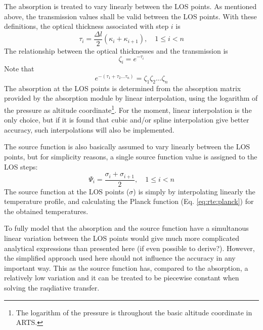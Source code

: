   \label{sec:rte:abs}
  
  The absorption is treated to vary linearly between the LOS points.
  As mentioned above, the transmission values shall be valid between the
  LOS points. With these definitions, the optical thickness associated with 
  step $i$ is
 \begin{equation}
    \tau_i = \frac{\Delta l}{2} \left( \kappa_i+\kappa_{i+1} \right),
                             \quad 1\leq i < n 
 \end{equation}
 The relationship between the optical thicknesses and
 the transmission is
 \begin{equation}
   \zeta_i = e^{-\tau_i}
 \end{equation}
 Note that
 \begin{equation}
   e^{-\left(\tau_1+\tau_2\dots\tau_n\right)}=\zeta_1\zeta_2\dots\zeta_n
 \end{equation}
 The absorption at the LOS points is determined from the absorption
 matrix provided by the absorption module by linear interpolation,
 using the logarithm of the pressure as altitude
 coordinate\footnote{The logarithm of the pressure is throughout the
   basic altitude coordinate in ARTS.}. For the moment, linear
 interpolation is the only choice, but if it is found that cubic
 and/or spline interpolation give better accuracy, such interpolations
 will also be implemented.


  \label{sec:rte:source}
  The source function is also basically assumed to vary linearly
  between the LOS points, but for simplicity reasons, a single
  source function value is assigned to the LOS steps:
  \begin{equation}
    \Psi_i = \frac{\sigma_i+\sigma_{i+1}}{2}, \quad 1\leq i < n
   \label{eq:rte:smean}
  \end{equation}   
  The source function at the LOS points ($\sigma$) is simply by
  interpolating linearly the temperature profile, and calculating the
  Planck function (Eq. \ref{eq:rte:planck}) for the obtained
  temperatures.
  
  To fully model that the absorption and the source function have a
  simultanous linear variation between the LOS points would give much
  more complicated analytical expressions than presented here (if even
  possible to derive?). However, the simplified approach used here
  should not influence the accuracy in any important way. This as the
  source function has, compared to the absorption, a relatively low
  variation and it can be treated to be piecewise constant when solving
  the raqdiative transfer.
  
